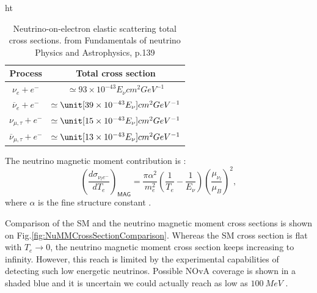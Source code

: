 \begin{table}{ht}
\centering
\caption{Neutrino-on-electron elastic scattering total cross sections.  from Fundamentals of neutrino Physics and Astrophysics, p.139}
\begin{tabular}{cc}
\hline
Process & Total cross section\\\hline
$\nu_e+e^-$ & $\simeq 93\times 10^{-43} E_\nu\unit{cm^2 GeV^{-1}}$\\
$\overline{\nu}_e+e^-$ & $\simeq \unit[39\times 10^{-43} E_\nu]{cm^2 GeV^{-1}}$\\
$\nu_{\mu,\tau}+e^-$ & $\simeq \unit[15\times 10^{-43} E_\nu]{cm^2 GeV^{-1}}$\\
$\overline{\nu}_{\mu,\tau}+e^-$ & $\simeq \unit[13\times 10^{-43} E_\nu]{cm^2 GeV^{-1}}$\\\hline
\end{tabular}
\end{table}

The neutrino magnetic moment contribution is  \cite{nuElmagInt2015.pdf}:
\begin{equation}
\left(\frac{d\sigma_{\nu_le^-}}{dT_e}\right)_{\textsf{MAG}}=\frac{\pi\alpha^2}{m_e^2}\left(\frac{1}{T_e}-\frac{1}{E_{\nu}}\right)\left(\frac{\mu_{\nu_l}}{\mu_B}\right)^2,
\end{equation}
where $\alpha$ is the fine structure constant .

Comparison of the \gls{SM} and the neutrino magnetic moment cross sections is shown on Fig.\ref{fig:NuMMCrossSectionComparison}. Whereas the \gls{SM} cross section is flat with $T_e\rightarrow 0$, the neutrino magnetic moment cross section keeps increasing to infinity. However, this reach is limited by the experimental capabilities of detecting such low energetic neutrinos. Possible \gls{NOvA} coverage is shown in a shaded blue and it is uncertain we could actually reach as low as $100\ \unit{MeV}$ .

